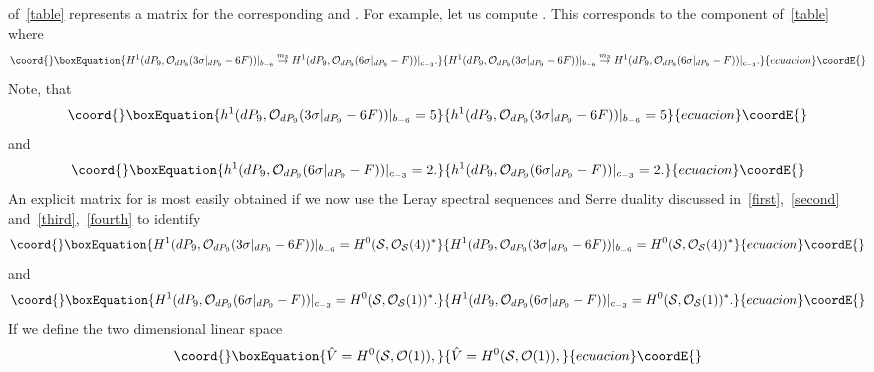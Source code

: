 \documentclass[a4paper,12pt]{article}
\numberwithin{equation}{section}
\theoremstyle{plain}
\begin{document}
of~\eqref{table} represents
a \coordHE{} matrix for the corresponding \coordHE{}
and \coordHE{}.
For example, let us compute \coordHE{}. This
corresponds to the \coordHE{} component of~\eqref{table} where
%
\begin{equation}\coord{}\boxEquation{
H^{1} (dP_9, {\cal O}_{dP_9} (3 \sigma|_{dP_9} -6F))|_{b_{-6}}
\stackrel{m_3}{\rightarrow}
H^{1} (dP_9, {\cal O}_{dP_9} (6 \sigma|_{dP_9} -F))|_{c_{-3}}.
\label{64}
}{
H^{1} (dP_9, {\cal O}_{dP_9} (3 \sigma|_{dP_9} -6F))|_{b_{-6}}
\stackrel{m_3}{\rightarrow}
H^{1} (dP_9, {\cal O}_{dP_9} (6 \sigma|_{dP_9} -F))|_{c_{-3}}.
}{ecuacion}\coordE{}\end{equation}
%
Note, that
%
\begin{equation}\coord{}\boxEquation{
h^{1} (dP_9, {\cal O}_{dP_9} (3 \sigma|_{dP_9} -6F))|_{b_{-6}} =5
\label{65}
}{
h^{1} (dP_9, {\cal O}_{dP_9} (3 \sigma|_{dP_9} -6F))|_{b_{-6}} =5
}{ecuacion}\coordE{}\end{equation}
%
and
%
\begin{equation}\coord{}\boxEquation{
h^{1} (dP_9, {\cal O}_{dP_9} (6 \sigma|_{dP_9} -F))|_{c_{-3}} =2.
\label{66}
}{
h^{1} (dP_9, {\cal O}_{dP_9} (6 \sigma|_{dP_9} -F))|_{c_{-3}} =2.
}{ecuacion}\coordE{}\end{equation}
%
An explicit matrix for \coordHE{} is most easily obtained if we now use the
Leray
spectral sequences and Serre duality discussed
in~\eqref{first},~\eqref{second}
and~\eqref{third},~\eqref{fourth} to identify
%
\begin{equation}\coord{}\boxEquation{
H^{1} (dP_9, {\cal O}_{dP_9} (3 \sigma|_{dP_9} -6F))|_{b_{-6}} =
H^{0} ({\cal S}, {\cal O}_{{\cal S}} (4))^{*}
\label{67}
}{
H^{1} (dP_9, {\cal O}_{dP_9} (3 \sigma|_{dP_9} -6F))|_{b_{-6}} =
H^{0} ({\cal S}, {\cal O}_{{\cal S}} (4))^{*}
}{ecuacion}\coordE{}\end{equation}
%
and
%
\begin{equation}\coord{}\boxEquation{
H^{1} (dP_9, {\cal O}_{dP_9} (6 \sigma|_{dP_9} -F))|_{c_{-3}}=
H^{0} ({\cal S}, {\cal O}_{{\cal S}} (1))^{*}.
\label{68}
}{
H^{1} (dP_9, {\cal O}_{dP_9} (6 \sigma|_{dP_9} -F))|_{c_{-3}}=
H^{0} ({\cal S}, {\cal O}_{{\cal S}} (1))^{*}.
}{ecuacion}\coordE{}\end{equation}
%
If we define the two dimensional linear space
%
\begin{equation}\coord{}\boxEquation{
\hat{V}= H^{0}({\cal S}, {\cal O}(1)),
\label{vec}
}{
\hat{V}= H^{0}({\cal S}, {\cal O}(1)),
}{ecuacion}\coordE{}\end{equation}
\end{document}
